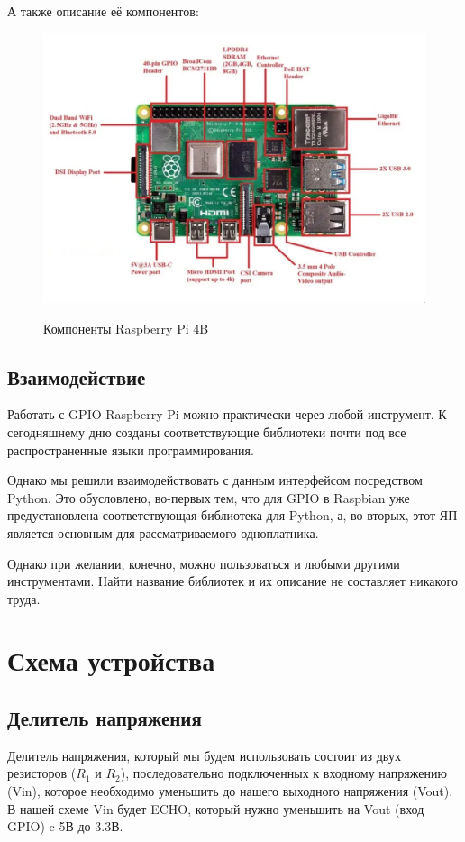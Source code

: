 \documentclass[a4paper, 14pt]{article}
\begin{document}
А также описание её компонентов:

\begin{figure}[H]
	\centering
	\includegraphics[width=12cm]{screenshots/15.png}\\
	\caption{Компоненты Raspberry Pi 4B}
\end{figure}

\subsection{Взаимодействие}

Работать с GPIO Raspberry Pi можно практически через любой инструмент. К сегодняшнему дню созданы соответствующие библиотеки почти под все распространенные языки программирования.

Однако мы решили взаимодействовать с данным интерфейсом посредством Python. Это обусловлено, во-первых тем, что для GPIO в Raspbian уже предустановлена соответствующая библиотека для Python, а, во-вторых, этот ЯП является основным для рассматриваемого одноплатника.

Однако при желании, конечно, можно пользоваться и любыми другими инструментами. Найти название библиотек и их описание не составляет никакого труда.

\newpage
\section{Схема устройства}

\subsection{Делитель напряжения}

Делитель напряжения, который мы будем использовать состоит из двух резисторов ($R_1$ и $R_2$), последовательно подключенных к входному напряжению (Vin), которое необходимо уменьшить до нашего выходного напряжения (Vout). В нашей схеме Vin будет ECHO, который нужно уменьшить на Vout (вход GPIO) c 5В до 3.3В.
\end{document}
